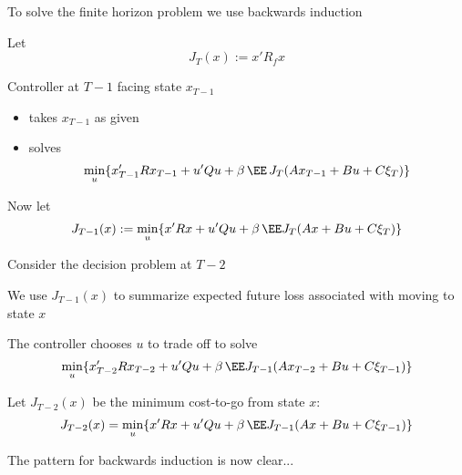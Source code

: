 \begin{frame}
    
    To solve the finite horizon problem we use backwards induction

    Let 
    $$ J_T(x) := x' R_f x $$
    
    Controller at $T-1$ facing state $x_{T-1}$

    \begin{itemize}
        \item takes $x_{T-1}$ as given
        \item solves
            \begin{equation*}
                \min_u 
                \{
                    x_{T-1}' R x_{T-1} + u' Q u + \beta \,
                    \EE \, J_T(A x_{T-1} + B u + C \xi_T)
                \}
            \end{equation*}
    \end{itemize}

    Now let 
    \begin{equation*}
        \label{eq:lq_lsm}
        J_{T-1} (x) :=
        \min_u \{
        x' R x + u' Q u + \beta \,
        \EE J_T(A x + B u + C \xi_T)
        \}
    \end{equation*}

\end{frame}




\begin{frame}
    
    Consider the decision problem at $T-2$
    
    We use $J_{T-1}(x)$ to summarize expected future loss associated with moving to state $x$

    The controller chooses $u$ to trade off to solve
    \begin{equation*}
        \min_u
        \{
            x_{T-2}' R x_{T-2} + u' Q u + \beta \,
            \EE J_{T-1}(Ax_{T-2} + B u + C \xi_{T-1})
        \}
    \end{equation*}

    Let $J_{T-2}(x)$ be the minimum cost-to-go from state $x$:
    \begin{equation*}
        J_{T-2} (x)
        = \min_u
        \{
        x' R x + u' Q u + \beta \,
        \EE J_{T-1}(Ax + B u + C \xi_{T-1})
        \}
    \end{equation*}

    The pattern for backwards induction is now clear... 

\end{frame}


